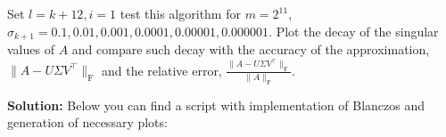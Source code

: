 \documentclass[11pt]{article}
\begin{document}
Set $l = k+12, i = 1$ test this algorithm for $m = 2^{11}$, $\sigma_{k+1} = 0.1, 0.01, 0.001, 0.0001, 0.00001, 0.000001$. Plot the decay of the singular values of $A$ and compare such decay with the accuracy of the approximation, $\| A - U \Sigma V^\top\|_{\text{F}}$ and the relative error, $\frac{\| A - U \Sigma V^\top\|_{\text{F}}}{\|A\|_{\text{F}}}$.

\textbf{Solution:} Below you can find a script with implementation of Blanczos and generation of necessary plots:





\end{document}
